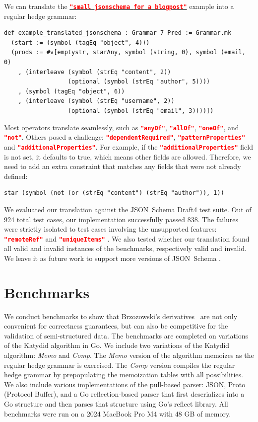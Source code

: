 \documentclass[runningheads]{llncs}
\newcommand{\jsonlink}[2]{\mbox{\hyperref[#2]{\lstinline[language=json]{#1}}}\xspace}
\newcommand{\JSONSchema}{%
  JSON~Schema\xspace%
}
\newcommand{\uniqueItems}{%
  \lstinline[language=json]|"uniqueItems"|\xspace%
}
\newcommand{\remoteRef}{%
  \lstinline[language=json]|"remoteRef"|\xspace%
}
\newcommand{\JSON}{\ac{JSON}\xspace}
\begin{document}
We can translate the \jsonlink{"small jsonschema for a blogpost"}{jsonschema_blogpost} example into a regular hedge grammar:
\begin{lstlisting}
def example_translated_jsonschema : Grammar 7 Pred := Grammar.mk
  (start := (symbol (tagEq "object", 4)))
  (prods := #v[emptystr, starAny, symbol (string, 0), symbol (email, 0)
    , (interleave (symbol (strEq "content", 2))
                  (optional (symbol (strEq "author", 5))))
    , (symbol (tagEq "object", 6))
    , (interleave (symbol (strEq "username", 2))
                  (optional (symbol (strEq "email", 3))))])
\end{lstlisting}
Most operators translate seamlessly, such as \lstinline[language=json]|"anyOf"|, \lstinline[language=json]|"allOf"|, \lstinline[language=json]|"oneOf"|, and \lstinline[language=json]|"not"|.
Others posed a challenge: \lstinline[language=json]|"dependentRequired"|, \lstinline[language=json]|"patternProperties"| and \lstinline[language=json]|"additionalProperties"|.
For example, if the \lstinline[language=json]|"additionalProperties"| field is not set, it defaults to true, which means other fields are allowed.
Therefore, we need to add an extra constraint that matches any fields that were not already defined:
\begin{lstlisting}
star (symbol (not (or (strEq "content") (strEq "author")), 1))
\end{lstlisting}
We evaluated our translation against the \JSONSchema Draft4 test suite.
Out of 924 total test cases, our implementation successfully passed 838.
The failures were strictly isolated to test cases involving the unsupported features: \remoteRef and \uniqueItems.
We also tested whether our translation found all valid and invalid instances of the benchmarks, respectively valid and invalid.
We leave it as future work to support more versions of \JSONSchema.

\section{Benchmarks}
\label{section_benchmarks}

We conduct benchmarks to show that Brzozowski's derivatives~\cite{brzozowski1964derivatives} are not only convenient for correctness guarantees, but can also be competitive for the validation of semi-structured data.
The benchmarks are completed on variations of the Katydid algorithm in Go.
We include two variations of the Katydid algorithm: \emph{Memo} and \emph{Comp}.
The \emph{Memo} version of the algorithm memoizes as the regular hedge grammar is exercised. 
The \emph{Comp} version compiles the regular hedge grammar by prepopulating the memoization tables with all possibilities.
We also include various implementations of the pull-based parser: \JSON, Proto (Protocol Buffer), and a Go reflection-based parser that first deserializes into a Go structure and then parses that structure using Go's reflect library.
All benchmarks were run on a 2024 MacBook Pro M4 with 48 GB of memory.
\end{document}
